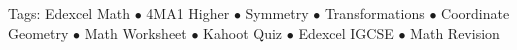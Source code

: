 \documentclass[11pt,a4paper]{article}
\begin{document}
\vspace{14pt}
\begin{center}
  \sffamily\scriptsize\textcolor{textmuted}{
    Tags: Edexcel Math $\bullet$ 4MA1 Higher $\bullet$ Symmetry $\bullet$ Transformations $\bullet$ Coordinate Geometry $\bullet$ Math Worksheet $\bullet$ Kahoot Quiz $\bullet$ Edexcel IGCSE $\bullet$ Math Revision
  }
\end{center}
\end{document}
